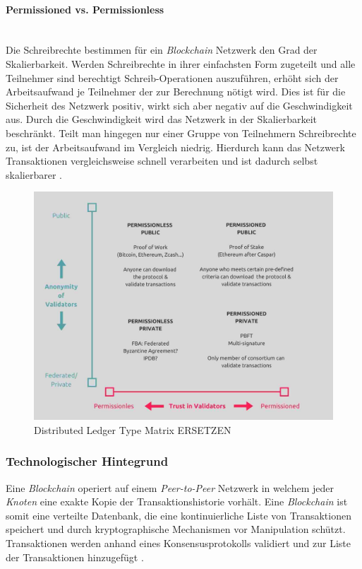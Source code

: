\paragraph{Permissioned vs. Permissionless}$~~$\\
Die Schreibrechte bestimmen für ein \textit{Blockchain} Netzwerk den Grad der Skalierbarkeit. Werden Schreibrechte in ihrer einfachsten Form zugeteilt und alle Teilnehmer sind berechtigt Schreib-Operationen auszuführen, erhöht sich der Arbeitsaufwand je Teilnehmer der zur Berechnung nötigt wird. Dies ist für die Sicherheit des Netzwerk positiv, wirkt sich aber negativ auf die Geschwindigkeit aus. Durch die Geschwindigkeit wird das Netzwerk in der Skalierbarkeit beschränkt. Teilt man hingegen nur einer Gruppe von Teilnehmern Schreibrechte zu, ist der Arbeitsaufwand im Vergleich niedrig. Hierdurch kann das Netzwerk Transaktionen vergleichsweise schnell verarbeiten und ist dadurch selbst skalierbarer \citep{Drescher2017}.

\begin{figure}[h!]
	\centering
	\includegraphics[width=1.0\linewidth]{pictures/dlt-type-matrix}
	\caption[Distributed Ledger Type Matrix]{Distributed Ledger Type Matrix ERSETZEN}
	\label{fig:dlt-type-matrix}
\end{figure}

\subsubsection{Technologischer Hintegrund}
Eine \textit{Blockchain} operiert auf einem \textit{Peer-to-Peer} Netzwerk in welchem jeder \textit{Knoten} eine exakte Kopie der Transaktionshistorie vorhält. Eine \textit{Blockchain} ist somit eine verteilte Datenbank, die eine kontinuierliche Liste von Transaktionen speichert und durch kryptographische Mechanismen vor Manipulation schützt. Transaktionen werden anhand eines Konsensusprotokolls validiert und zur Liste der Transaktionen hinzugefügt \citep{Nakamoto2009}.

